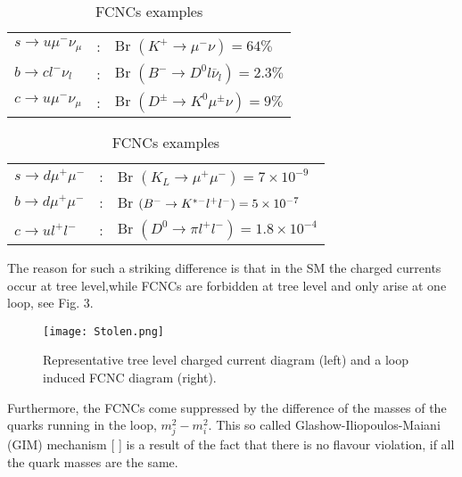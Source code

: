 \begin{table}[!htb]
    \begin{minipage}{.5\linewidth}
      \caption{FCCCs examples}
\centering
\begin{tabular}{lcl}
$s \rightarrow u \mu^- \nu_\mu $ & : & Br $\left( K^+ \rightarrow \mu^- \nu\right) = 64 \%$                 \\
$b \rightarrow c l^- \nu_l $       & : & Br $\left( B^- \rightarrow D^0 l \overline{\nu}_l \right) = 2.3 \% $ \\
$c \rightarrow u \mu^- \nu_\mu $   & : & Br $\left( D^\pm \rightarrow K^0 \mu^\pm \nu \right) = 9 \%$        
\end{tabular}
    \end{minipage}%
    \begin{minipage}{.5\linewidth}
      \centering
        \caption{FCNCs examples}
\begin{tabular}{lcl}
$s \rightarrow d \mu^+ \mu^- $ & : & Br $\left( K_L \rightarrow\mu^+ \mu^- \right) =  7\times10^{-9}$        \\
$ b \rightarrow d \mu^+ \mu^-$ & : & Br $\left( B^- \rightarrow  K^{\** -} l^+ l^- \right) =  5\times10^{-7}$ \\
$ c \rightarrow u l^+ l^-$     & : & Br $\left( D^0 \rightarrow \pi l^+ l^- \right) =  1.8\times10^{-4}$      
\end{tabular}
    \end{minipage} 
\end{table}

The reason for such a striking difference is that in the SM the charged currents occur at tree level,while FCNCs are forbidden at tree level and only arise at one loop, see Fig. 3.

\begin{figure}[H]
	\centering
	\texttt{[image: Stolen.png]}
	\caption{Representative tree level charged current diagram (left) and a loop induced FCNC diagram (right).}
	\label{fig:Yukawa}
\end{figure}


Furthermore, the FCNCs come suppressed by the difference of the masses of the quarks running in the loop, $m^2_j-m^2_i$. This so called Glashow-Iliopoulos-Maiani (GIM) mechanism [
] is a result of the fact that there is no flavour violation, if all the quark masses are the same.


